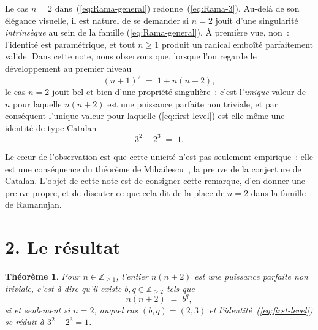 \documentclass[12pt,a4paper]{article}
\newtheorem{theoreme}{Théorème}
\begin{document}
Le cas $n = 2$ dans~(\ref{eq:Rama-general}) redonne~(\ref{eq:Rama-3}). Au-delà
de son élégance visuelle, il est naturel de se demander si $n = 2$ jouit
d'une singularité \emph{intrinsèque} au sein de la famille
(\ref{eq:Rama-general}). À première vue, non~: l'identité est paramétrique,
et tout $n \geq 1$ produit un radical emboîté parfaitement valide. Dans cette
note, nous observons que, lorsque l'on regarde le développement au premier
niveau
\begin{equation}
(n+1)^2 \;=\; 1 + n(n+2),
\label{eq:first-level}
\end{equation}
le cas $n = 2$ jouit bel et bien d'une propriété singulière~: c'est l'\emph{unique}
valeur de $n$ pour laquelle $n(n+2)$ est une puissance parfaite non triviale,
et par conséquent l'unique valeur pour laquelle (\ref{eq:first-level}) est
elle-même une identité de type Catalan
\begin{equation}
3^2 - 2^3 \;=\; 1.
\label{eq:Catalan-3-2}
\end{equation}

Le cœur de l'observation est que cette unicité n'est pas seulement empirique~:
elle est une conséquence du théorème de Mihailescu~\cite{Mihailescu2004}, la
preuve de la conjecture de Catalan. L'objet de cette note est de consigner
cette remarque, d'en donner une preuve propre, et de discuter ce que cela
dit de la place de $n = 2$ dans la famille de Ramanujan.

\section*{2. Le résultat}

\begin{theoreme}\label{thm:main}
Pour $n \in \mathbb{Z}_{\geq 1}$, l'entier $n(n+2)$ est une puissance
parfaite non triviale, c'est-à-dire qu'il existe $b, q \in \mathbb{Z}_{\geq 2}$
tels que
\[
n(n+2) \;=\; b^{q},
\]
si et seulement si $n = 2$, auquel cas $(b, q) = (2, 3)$ et
l'identité~(\ref{eq:first-level}) se réduit à $3^{2} - 2^{3} = 1$.
\end{theoreme}
\end{document}
